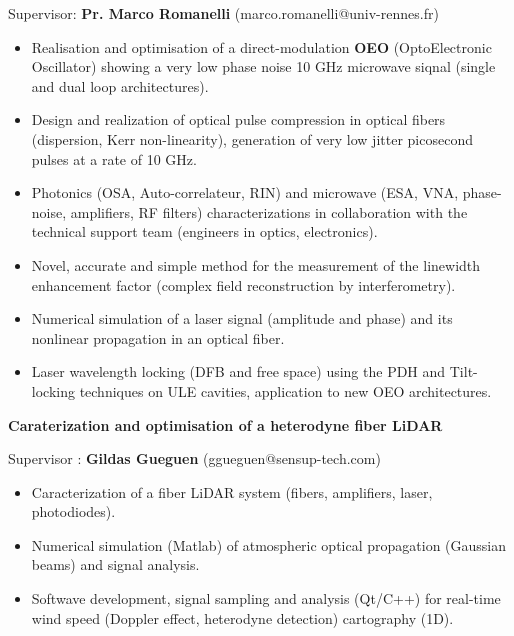 \documentclass[9pt,a4paper,academicons]{altacv}
\begin{document}
Supervisor: \textbf{Pr. Marco Romanelli} (marco.romanelli@univ-rennes.fr)
\smallskip
\small{
	\begin{itemize}
		\item Realisation and optimisation of a direct-modulation \textbf{OEO} (OptoElectronic Oscillator) showing a very low phase noise 10 GHz microwave siqnal (single and dual loop architectures).
		
		\item Design and realization of optical pulse compression in optical fibers (dispersion, Kerr non-linearity), generation of very low jitter picosecond pulses at a rate of 10 GHz. 
		\item Photonics (OSA, Auto-correlateur, RIN) and microwave (ESA, VNA, phase-noise, amplifiers, RF filters) characterizations in collaboration with the technical support team (engineers in optics, electronics).
		\item Novel, accurate and simple method for the measurement of the linewidth enhancement factor (complex field reconstruction by interferometry).
		\item Numerical simulation of a laser signal (amplitude and phase) and its nonlinear propagation in an optical fiber.
		\item Laser wavelength locking (DFB and free space) using the PDH and Tilt-locking techniques on ULE cavities, application to new OEO architectures.
	\end{itemize}
}

\divider


\textbf{Caraterization and optimisation of a heterodyne fiber LiDAR}\smallskip

Supervisor : \textbf{Gildas Gueguen} (ggueguen@sensup-tech.com)
\smallskip
\small{
	\begin{itemize}
		\item Caracterization of a fiber LiDAR system (fibers, amplifiers, laser, photodiodes).
		\item Numerical simulation (Matlab) of atmospheric optical propagation (Gaussian beams) and signal analysis.
		\item Softwave development, signal sampling and analysis (Qt/C++) for real-time wind speed (Doppler effect, heterodyne detection) cartography (1D).
	\end{itemize}
}

\divider
\end{document}
